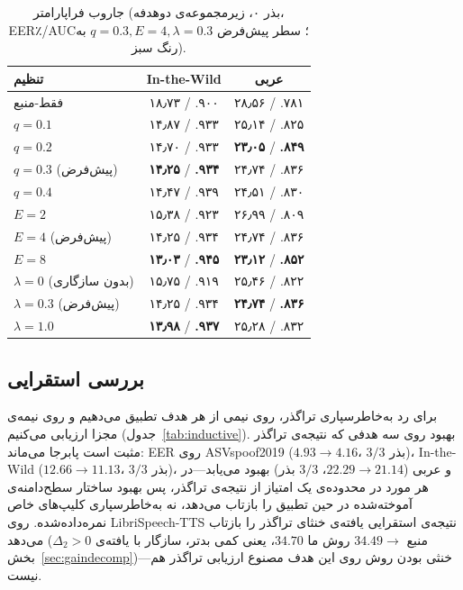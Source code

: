 \documentclass[a4paper,11pt]{article}
\begin{document}
\begin{table}[t]
\centering
\caption{جاروب فراپارامتر (بذر ۰، زیرمجموعه‌ی دوهدفه، EER٪/AUC؛ سطر
پیش‌فرض $q{=}0.3,E{=}4,\lambda{=}0.3$ به رنگ \colorbox{green!12}{سبز}).}
\label{tab:sweep}
\begin{tabular}{@{}lcc@{}}
\toprule
تنظیم & In-the-Wild & عربی \\
\midrule
فقط-منبع & ۱۸٫۷۳ / .۹۰۰ & ۲۸٫۵۶ / .۷۸۱ \\
\midrule
$q=0.1$ & ۱۴٫۸۷ / .۹۳۳ & ۲۵٫۱۴ / .۸۲۵ \\
$q=0.2$ & ۱۴٫۷۰ / .۹۳۳ & \textbf{۲۳٫۰۵} / \textbf{.۸۴۹} \\
\rowcolor{green!12}$q=0.3$ (پیش‌فرض) & \textbf{۱۴٫۲۵} / \textbf{.۹۳۴} & ۲۴٫۷۴ / .۸۳۶ \\
$q=0.4$ & ۱۴٫۴۷ / .۹۳۹ & ۲۴٫۵۱ / .۸۳۰ \\
\midrule
$E=2$ & ۱۵٫۳۸ / .۹۲۳ & ۲۶٫۹۹ / .۸۰۹ \\
\rowcolor{green!12}$E=4$ (پیش‌فرض) & ۱۴٫۲۵ / .۹۳۴ & ۲۴٫۷۴ / .۸۳۶ \\
$E=8$ & \textbf{۱۳٫۰۳} / \textbf{.۹۴۵} & \textbf{۲۳٫۱۲} / \textbf{.۸۵۲} \\
\midrule
$\lambda=0$ (بدون سازگاری) & ۱۵٫۷۵ / .۹۱۹ & ۲۵٫۴۶ / .۸۲۲ \\
\rowcolor{green!12}$\lambda=0.3$ (پیش‌فرض) & ۱۴٫۲۵ / .۹۳۴ & \textbf{۲۴٫۷۴} / \textbf{.۸۳۶} \\
$\lambda=1.0$ & \textbf{۱۳٫۹۸} / \textbf{.۹۳۷} & ۲۵٫۲۸ / .۸۳۲ \\
\bottomrule
\end{tabular}
\end{table}

\subsection{بررسی استقرایی}
\label{sec:inductive}
برای رد به‌خاطرسپاری تراگذر، روی نیمی از هر هدف تطبیق می‌دهیم و روی نیمه‌ی
مجزا ارزیابی می‌کنیم (جدول~\ref{tab:inductive}). بهبود روی سه هدفی که
نتیجه‌ی تراگذر مثبت است پابرجا می‌ماند: EER روی ASVspoof2019
($4.93\!\to\!4.16$، $3/3$ بذر)، In-the-Wild ($12.66\!\to\!11.13$، $3/3$
بذر)، و عربی ($22.29\!\to\!21.14$، $3/3$ بذر) بهبود می‌یابد---در هر مورد در
محدوده‌ی یک امتیاز از نتیجه‌ی تراگذر، پس بهبود ساختار سطح‌دامنه‌ی آموخته‌شده
در حین تطبیق را بازتاب می‌دهد، نه به‌خاطرسپاری کلیپ‌های خاص نمره‌داده‌شده.
روی LibriSpeech-TTS نتیجه‌ی استقرایی یافته‌ی خنثای تراگذر را بازتاب می‌دهد
(منبع $34.49\!\to\!$ روش ما $34.70$، یعنی کمی بدتر، سازگار با یافته‌ی
$\Delta_2{>}0$ بخش~\ref{sec:gaindecomp})---خنثی بودن روش روی این هدف مصنوع
ارزیابی تراگذر هم نیست.
\end{document}
